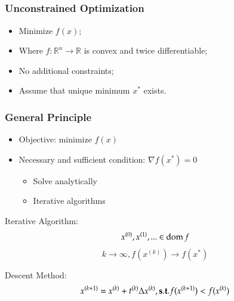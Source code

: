 

\newcommand\desmeth{x^{(k+1)} = x^{(k)} + t^{(k)}\Delta x^{(k)}}
\newcommand\satis{{\bf \small s.t}.   f(x^{(k+1)}) < f(x^{(k)})}
\newcommand\xk[1]{x^{(#1)}}
\newcommand\bx{{\bf x}}

\subsection{}
\begin{frame}
  \frametitle{Unconstrained Optimization}
  \begin{itemize}
  \item Minimize $f(x)$;
  \item Where $f : \mathbb{R}^n \rightarrow \mathbb{R}$ is convex
    and twice differentiable;
  \item No additional constraints;
  \item Assume that unique minimum $x^*$ exists.
  \end{itemize}
\end{frame}

\begin{frame}
  \frametitle{General Principle}
  \begin{itemize}
  \item Objective: minimize $f(x)$
  \item Necessary and sufficient condition: $\nabla f(x^*) = 0$
    \begin{itemize}
    \item Solve analytically
    \item Iterative algorithms
    \end{itemize}
  \end{itemize}

  \begin{block}{ Iterative Algorithm:}
    $$\xk{0}, \xk{1}, ... \in \dom f$$
    $$k \rightarrow \infty, f(\xk{k}) \rightarrow f(x^*) $$
  \end{block}

  \begin{block}{Descent Method:}
    $$\desmeth,  \satis$$
  \end{block}

\end{frame}


